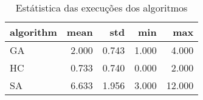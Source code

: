 \begin{table}
\caption{Estátistica das execuções dos algoritmos}
\begin{tabular}{lrrrr}
\toprule
algorithm & mean & std & min & max \\
\midrule
GA & 2.000 & 0.743 & 1.000 & 4.000 \\
HC & 0.733 & 0.740 & 0.000 & 2.000 \\
SA & 6.633 & 1.956 & 3.000 & 12.000 \\
\bottomrule
\end{tabular}
\end{table}
